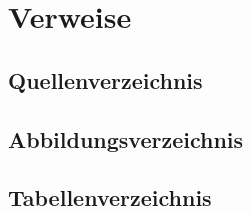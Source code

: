 \section{Verweise}
    \subsection*{Quellenverzeichnis}
    

    \subsection*{Abbildungsverzeichnis}
        \renewcommand{\listfigurename}{\vspace*{-1cm}}
        \listoffigures

    \subsection*{Tabellenverzeichnis}
        \renewcommand{\listtablename}{\vspace*{-1cm}}
        \listoftables
